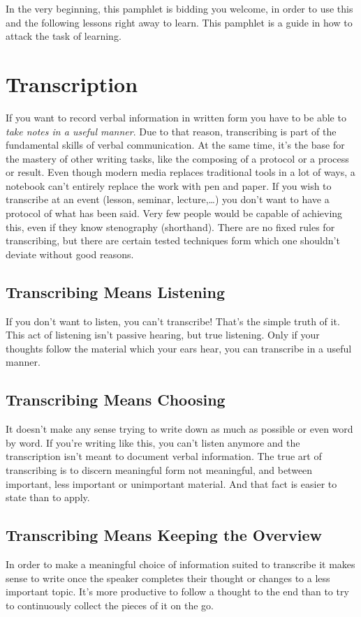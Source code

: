 \documentclass[../main.tex]{subfiles}
\begin{document}
In the very beginning, this pamphlet is bidding you welcome, in order to use this and the following lessons right away to learn.
This pamphlet is a guide in how to attack the task of learning.

\section{Transcription}
If you want to record verbal information in written form you have to be able to \emph{take notes in a useful manner}. Due to that reason, transcribing is part of the fundamental skills of verbal communication. At the same time, it's the base for the mastery of other writing tasks, like the composing of a protocol or a process or result.
Even though modern media replaces traditional tools in a lot of ways, a notebook can't entirely replace the work with pen and paper.
If you wish to transcribe at an event (lesson, seminar, lecture,\ldots ) you don't want to have a protocol of what has been said.
Very few people would be capable of achieving this, even if they know stenography (shorthand).
There are no fixed rules for transcribing, but there are certain tested techniques form which one shouldn't deviate without good reasons.

\subsection{Transcribing Means Listening}
If you don't want to listen, you can't transcribe! That's the simple truth of it. This act of listening isn't passive hearing, but {true listening}. Only if your thoughts follow the material which your ears hear, you can transcribe in a useful manner.


\subsection{Transcribing Means Choosing}

It doesn't make any sense trying to write down as much as possible or even word by word.
If you're writing like this, you can't listen anymore and the transcription isn't meant to document verbal information.
The true art of transcribing is to discern meaningful form not meaningful, and between important, less important or unimportant material.
And that fact is easier to state than to apply.

\subsection{Transcribing Means Keeping the Overview}
In order to make a meaningful choice of information suited to transcribe it makes sense to write once the speaker completes their thought or changes to a less important topic.
It's more productive to follow a thought to the end than to try to continuously collect the pieces of it on the go.
\end{document}
